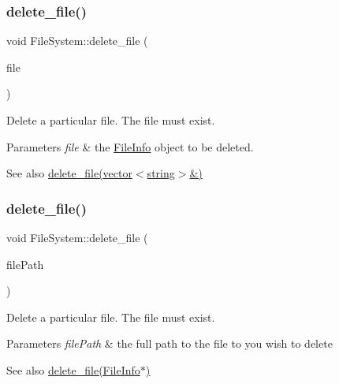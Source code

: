\subsubsection{\texorpdfstring{delete\+\_\+file()}{delete\_file()}\hspace{0.1cm}{\footnotesize\ttfamily [1/2]}}
{\footnotesize\ttfamily void File\+System\+::delete\+\_\+file (\begin{DoxyParamCaption}\item[{\mbox{\hyperlink{classFileInfo}{File\+Info}} $\ast$}]{file }\end{DoxyParamCaption})}

Delete a particular file. The file must exist. 
\begin{DoxyParams}{Parameters}
{\em file} & the \mbox{\hyperlink{classFileInfo}{File\+Info}} object to be deleted. \\
\hline
\end{DoxyParams}
\begin{DoxySeeAlso}{See also}
\mbox{\hyperlink{classFileSystem_a5620f645c0e25ade03f14ae81432654c}{delete\+\_\+file(vector$<$string$>$\&)}} 
\end{DoxySeeAlso}
\mbox{\label{classFileSystem_a5620f645c0e25ade03f14ae81432654c}} 
\subsubsection{\texorpdfstring{delete\+\_\+file()}{delete\_file()}\hspace{0.1cm}{\footnotesize\ttfamily [2/2]}}
{\footnotesize\ttfamily void File\+System\+::delete\+\_\+file (\begin{DoxyParamCaption}\item[{vector$<$ string $>$ \&}]{file\+Path }\end{DoxyParamCaption})}

Delete a particular file. The file must exist. 
\begin{DoxyParams}{Parameters}
{\em file\+Path} & the full path to the file to you wish to delete \\
\hline
\end{DoxyParams}
\begin{DoxySeeAlso}{See also}
\mbox{\hyperlink{classFileSystem_a2718456ead4a9e7244c33d4a86cb844c}{delete\+\_\+file(\+File\+Info$\ast$)}} 
\end{DoxySeeAlso}
\mbox{\label{classFileSystem_a7c1842bbdfc9bb43c848b21886dac602}} 
